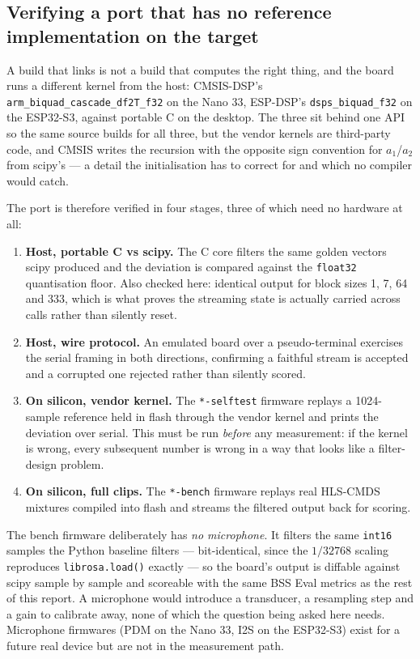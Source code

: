 \documentclass[11pt]{article}
\begin{document}
\subsection{Verifying a port that has no reference implementation on the target}
\label{sec:firmware-verify}

A build that links is not a build that computes the right thing, and the
board runs a different kernel from the host: CMSIS-DSP's
\texttt{arm\_biquad\_cascade\_df2T\_f32} on the Nano 33, ESP-DSP's
\texttt{dsps\_biquad\_f32} on the ESP32-S3, against portable C on the
desktop. The three sit behind one API so the same source builds for all
three, but the vendor kernels are third-party code, and CMSIS writes the
recursion with the opposite sign convention for $a_1$/$a_2$ from scipy's
--- a detail the initialisation has to correct for and which no compiler
would catch.

The port is therefore verified in four stages, three of which need no
hardware at all:

\begin{enumerate}
  \item \textbf{Host, portable C vs scipy.} The C core filters the same
    golden vectors scipy produced and the deviation is compared against the
    \texttt{float32} quantisation floor. Also checked here: identical output
    for block sizes 1, 7, 64 and 333, which is what proves the streaming
    state is actually carried across calls rather than silently reset.
  \item \textbf{Host, wire protocol.} An emulated board over a pseudo-terminal
    exercises the serial framing in both directions, confirming a faithful
    stream is accepted and a corrupted one rejected rather than silently
    scored.
  \item \textbf{On silicon, vendor kernel.} The \texttt{*-selftest} firmware
    replays a 1024-sample reference held in flash through the vendor kernel
    and prints the deviation over serial. This must be run \emph{before} any
    measurement: if the kernel is wrong, every subsequent number is wrong in
    a way that looks like a filter-design problem.
  \item \textbf{On silicon, full clips.} The \texttt{*-bench} firmware
    replays real HLS-CMDS mixtures compiled into flash and streams the
    filtered output back for scoring.
\end{enumerate}

The bench firmware deliberately has \emph{no microphone}. It filters the same
\texttt{int16} samples the Python baseline filters --- bit-identical, since
the $1/32768$ scaling reproduces \texttt{librosa.load()} exactly --- so the
board's output is diffable against scipy sample by sample and scoreable with
the same BSS Eval metrics as the rest of this report. A microphone would
introduce a transducer, a resampling step and a gain to calibrate away, none
of which the question being asked here needs. Microphone firmwares (PDM on
the Nano 33, I2S on the ESP32-S3) exist for a future real device but are not
in the measurement path.
\end{document}
